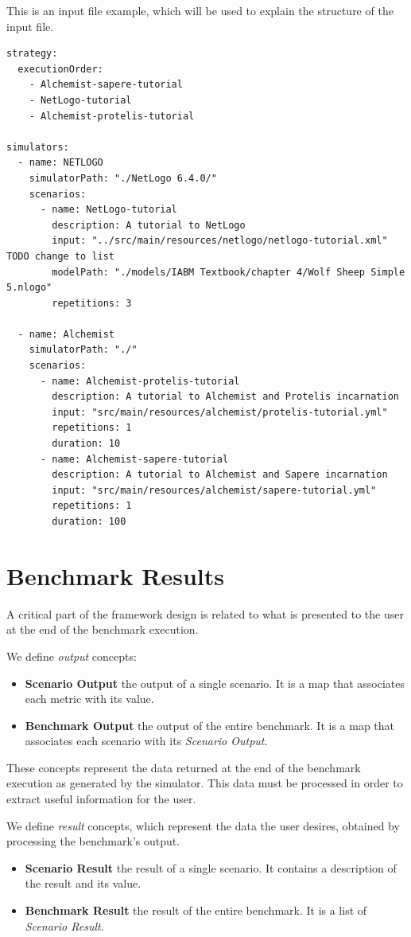 \documentclass[12pt,a4paper,openright,twoside]{book}
\begin{document}
This is an input file example, which will be used to explain the structure of the input file.

\begin{lstlisting}[style=yaml]
strategy:
  executionOrder:
    - Alchemist-sapere-tutorial
    - NetLogo-tutorial
    - Alchemist-protelis-tutorial

simulators:
  - name: NETLOGO
    simulatorPath: "./NetLogo 6.4.0/"
    scenarios:
      - name: NetLogo-tutorial
        description: A tutorial to NetLogo
        input: "../src/main/resources/netlogo/netlogo-tutorial.xml" TODO change to list
        modelPath: "./models/IABM Textbook/chapter 4/Wolf Sheep Simple 5.nlogo"
        repetitions: 3

  - name: Alchemist
    simulatorPath: "./"
    scenarios:
      - name: Alchemist-protelis-tutorial
        description: A tutorial to Alchemist and Protelis incarnation
        input: "src/main/resources/alchemist/protelis-tutorial.yml"
        repetitions: 1
        duration: 10
      - name: Alchemist-sapere-tutorial
        description: A tutorial to Alchemist and Sapere incarnation
        input: "src/main/resources/alchemist/sapere-tutorial.yml"
        repetitions: 1
        duration: 100
\end{lstlisting}

\section{Benchmark Results}

A critical part of the framework design is related to what is presented to the user at the end of the benchmark execution.

We define \emph{output} concepts:
\begin{itemize}
  \item \textbf{Scenario Output} the output of a single scenario. It is a map that associates each metric with its value.
  \item \textbf{Benchmark Output} the output of the entire benchmark. It is a map that associates each scenario with its \emph{Scenario Output}.
\end{itemize}

These concepts represent the data returned at the end of the benchmark execution as generated by the simulator.
This data must be processed in order to extract useful information for the user.

We define \emph{result} concepts, which represent the data the user desires, obtained by processing the benchmark's output.
\begin{itemize}
  \item \textbf{Scenario Result} the result of a single scenario. It contains a description of the result and its value.
  \item \textbf{Benchmark Result} the result of the entire benchmark. It is a list of \emph{Scenario Result}.
\end{itemize}
\end{document}
